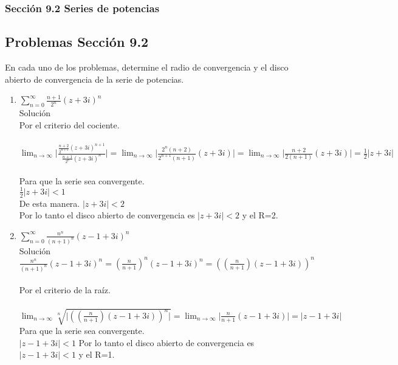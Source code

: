 \documentclass[12pt,letterpaper]{article}
\providecommand{\abs}[1]{\lvert#1\rvert}
\begin{document}
	\subsubsection* {Secci\'on 9.2 Series de potencias}
	\subsection* {Problemas Secci\'on 9.2}
\justify
En cada uno de los problemas, determine el radio de convergencia y el disco abierto de convergencia de la serie de potencias.
\begin{enumerate}
\item $\sum\limits_{n=0}^\infty\frac{n+1}{2^n}(z+3i)^n$\\
Soluci\'on\\
Por el criterio del cociente.\\ \\
$\lim_{n \to \infty}\abs{\frac{\frac{n+2}{2^{n+1}}(z+3i)^{n+1}}{\frac{n+1}{2^n}(z+3i)^n}}= \lim_{n \to \infty}\abs{\frac{2^n(n+2)}{2^{n+1}(n+1)}(z+3i)}= \lim_{n \to \infty}\abs{\frac{n+2}{2(n+1)}(z+3i)}=\frac{1}{2}\abs{z+3i}$\\ \\
Para que la serie sea convergente.\\
$\frac{1}{2}\abs{z+3i} < 1$\\ 
De esta manera.
$\abs{z+3i} < 2$\\
Por lo tanto el disco abierto de convergencia es $\abs{z+3i} < 2$ y el R=2.

\item $\sum\limits_{n=0}^\infty\frac{n^n}{(n+1)^n}(z-1+3i)^n$\\
Soluci\'on\\
$\frac{n^n}{(n+1)^n}(z-1+3i)^n = (\frac{n}{n+1})^n(z-1+3i)^n = ((\frac{n}{n+1})(z-1+3i))^n$\\ \\
Por el criterio de la ra\'iz.\\ \\
$\lim_{n \to \infty}\sqrt[n]{\abs{((\frac{n}{n+1})(z-1+3i))^n}}=\lim_{n \to \infty}\abs{\frac{n}{n+1}(z-1+3i)} = \abs{z-1+3i}$\\
Para que la serie sea convergente.\\
$\abs{z-1+3i}<1$
Por lo tanto el disco abierto de convergencia es $\abs{z-1+3i} < 1$ y el R=1.


\end{enumerate}
\end{document}
